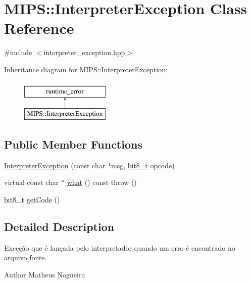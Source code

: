 \hypertarget{classMIPS_1_1InterpreterException}{}\section{M\+I\+PS\+:\+:Interpreter\+Exception Class Reference}
\label{classMIPS_1_1InterpreterException}


{\ttfamily \#include $<$interpreter\+\_\+exception.\+hpp$>$}

Inheritance diagram for M\+I\+PS\+:\+:Interpreter\+Exception\+:\begin{figure}[H]
\begin{center}
\leavevmode
\includegraphics[height=2.000000cm]{classMIPS_1_1InterpreterException}
\end{center}
\end{figure}
\subsection*{Public Member Functions}
\begin{DoxyCompactItemize}
\item 
\hyperlink{classMIPS_1_1InterpreterException_a8c3cc0b526ddeca99eee51bfbf353549}{Interpreter\+Exception} (const char $\ast$msg, \hyperlink{core_8hpp_a6074bae122ae7b527864eec42c728c3c}{bit8\+\_\+t} opcode)
\item 
virtual const char $\ast$ \hyperlink{classMIPS_1_1InterpreterException_a7ddaf2edf53aaaf5b0ad995635033003}{what} () const   throw ()
\item 
\hyperlink{core_8hpp_a6074bae122ae7b527864eec42c728c3c}{bit8\+\_\+t} \hyperlink{classMIPS_1_1InterpreterException_a6d2fc264fb6b9c61bf9690747d1bf5b6}{get\+Code} ()
\end{DoxyCompactItemize}


\subsection{Detailed Description}
Exceção que é lançada pelo interpretador quando um erro é encontrado no arquivo fonte.

\begin{DoxyAuthor}{Author}
Matheus Nogueira 
\end{DoxyAuthor}



